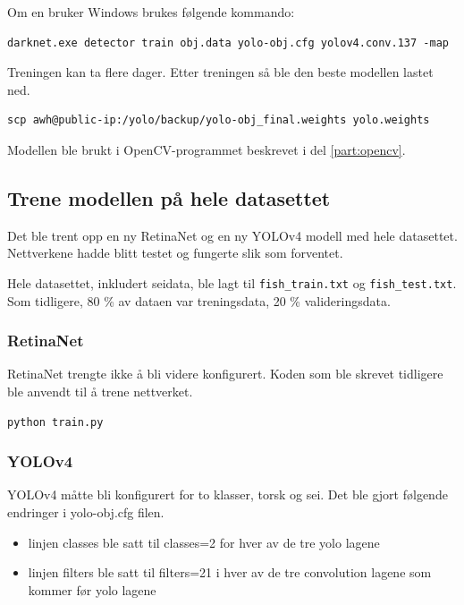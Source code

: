 Om en bruker Windows brukes følgende kommando:

\begin{verbatim}
darknet.exe detector train obj.data yolo-obj.cfg yolov4.conv.137 -map
\end{verbatim}

Treningen kan ta flere dager. Etter treningen så ble den beste modellen lastet ned.

\begin{verbatim}
scp awh@public-ip:/yolo/backup/yolo-obj_final.weights yolo.weights
\end{verbatim}

Modellen ble brukt i OpenCV-programmet beskrevet i del \ref{part:opencv}. 

\subsection{Trene modellen på hele datasettet}

Det ble trent opp en ny RetinaNet og en ny YOLOv4 modell med hele datasettet. Nettverkene hadde blitt testet og fungerte slik som forventet.

Hele datasettet, inkludert seidata, ble lagt til \texttt{fish\_train.txt} og \texttt{fish\_test.txt}. Som tidligere, 80 \% av dataen var treningsdata, 20 \% valideringsdata.

\subsubsection{RetinaNet}

RetinaNet trengte ikke å bli videre konfigurert. Koden som ble skrevet tidligere ble anvendt til å trene nettverket.

\begin{verbatim}
python train.py
\end{verbatim}

\subsubsection{YOLOv4}

YOLOv4 måtte bli konfigurert for to klasser, torsk og sei. Det ble gjort følgende endringer i yolo-obj.cfg filen.

\begin{itemize}
  \item linjen classes ble satt til classes=2 for hver av de tre yolo lagene
  \item linjen filters ble satt til filters=21 i hver av de tre convolution lagene som kommer før yolo lagene
\end{itemize}

